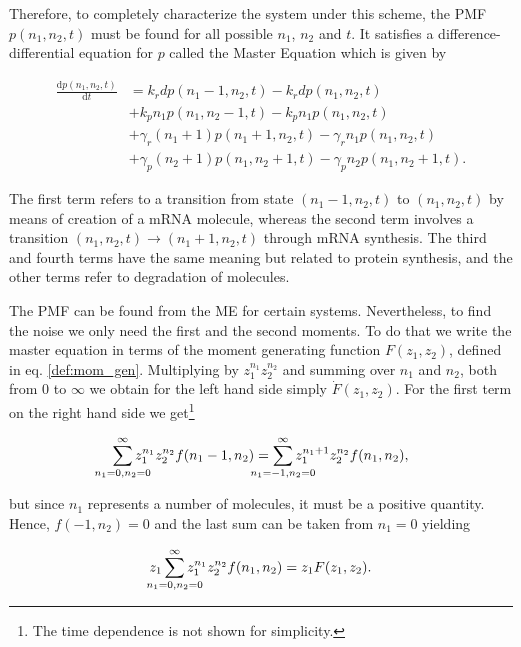 Therefore, to completely characterize the system under this scheme, the PMF $p(n_1,n_2,t)$ must be found for all possible $n_1$, $n_2$ and $t$. It satisfies a difference-differential equation for $p$ called the Master Equation which is given by

\begin{equation}
  \label{eq:master}
  \begin{split}
    \frac{\mathrm{d}p(n_1,n_2,t)}{\mathrm{d}t} &= k_rdp(n_1-1,n_2,t) - k_rdp(n_1,n_2,t)\\
&+ k_pn_1p(n_1,n_2-1,t) - k_pn_1p(n_1,n_2,t)\\
&+ \gamma_r(n_1+1)p(n_1+1,n_2,t) - \gamma_rn_1p(n_1,n_2,t)\\
&+ \gamma_p(n_2+1)p(n_1,n_2+1,t) - \gamma_pn_2p(n_1,n_2+1,t).
  \end{split}
\end{equation}

The first term refers to a transition from state $(n_1-1,n_2,t)$ to $(n_1,n_2,t)$ by means of creation of a mRNA molecule, whereas the second term involves a transition $(n_1,n_2,t) \rightarrow (n_1+1,n_2,t)$ through mRNA synthesis. The third and fourth terms have the same meaning but related to protein synthesis, and the other terms refer to degradation of molecules.

The PMF can be found from the ME for certain systems. Nevertheless, to find the noise we only need the first and the second moments. To do that we write the master equation in terms of the moment generating function $F(z_1,z_2)$, defined in eq. \eqref{def:mom_gen}. Multiplying by $z_1^{n_1}z_2^{n_2}$ and summing over $n_1$ and $n_2$, both from $0$ to $\infty$ we obtain for the left hand side simply $\dot{F}(z_1,z_2)$. For the first term on the right hand side we get\footnote{The time dependence is not shown for simplicity.}

\begin{equation*}
  \sum_{\mathclap{n_1=0,n_2=0}}^\infty z_1^{n_1}z_2^{n_2}f(n_1-1,n_2) = \sum_{\mathclap{n_1=-1,n_2=0}}^\infty z_1^{n_1+1}z_2^{n_2}f(n_1,n_2),
\end{equation*}

but since $n_1$ represents a number of molecules, it must be a positive quantity. Hence, $f(-1,n_2)=0$ and the last sum can be taken from $n_1=0$ yielding

\begin{equation*}
  z_1 \sum_{\mathclap{n_1=0,n_2=0}}^\infty z_1^{n_1}z_2^{n_2}f(n_1,n_2) = z_1F(z_1,z_2).
\end{equation*}

